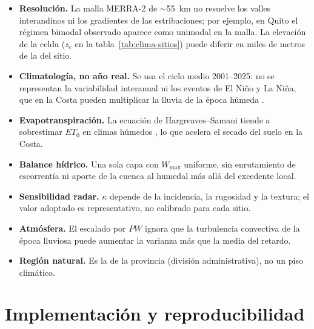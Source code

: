 \documentclass[11pt,a4paper]{article}
\begin{document}
\begin{itemize}
  \item \textbf{Resolución.} La malla MERRA-2 de $\sim$55~km no resuelve los valles interandinos ni los
        gradientes de las estribaciones; por ejemplo, en Quito el régimen bimodal observado
        \cite{pourrut1995} aparece como unimodal en la malla. La elevación de la celda ($z_c$ en la tabla~\ref{tab:clima-sitios}) puede diferir en
        miles de metros de la del sitio.
  \item \textbf{Climatología, no año real.} Se usa el ciclo medio 2001--2025: no se representan la
        variabilidad interanual ni los eventos de El Niño y La Niña, que en la Costa pueden multiplicar la
        lluvia de la época húmeda \cite{vuille2000}.
  \item \textbf{Evapotranspiración.} La ecuación de Hargreaves--Samani tiende a sobrestimar $ET_0$ en
        climas húmedos \cite{droogers2002}, lo que acelera el secado del suelo en la Costa.
  \item \textbf{Balance hídrico.} Una sola capa con $W_{\max}$ uniforme, sin enrutamiento de
        escorrentía ni aporte de la cuenca al humedal más allá del excedente local.
  \item \textbf{Sensibilidad radar.} $\kappa$ depende de la incidencia, la rugosidad y la textura; el
        valor adoptado es representativo, no calibrado para cada sitio.
  \item \textbf{Atmósfera.} El escalado por $PW$ ignora que la turbulencia convectiva de la época
        lluviosa puede aumentar la varianza más que la media del retardo.
  \item \textbf{Región natural.} Es la de la provincia (división administrativa), no un piso climático.
\end{itemize}

\section{Implementación y reproducibilidad}
\end{document}
